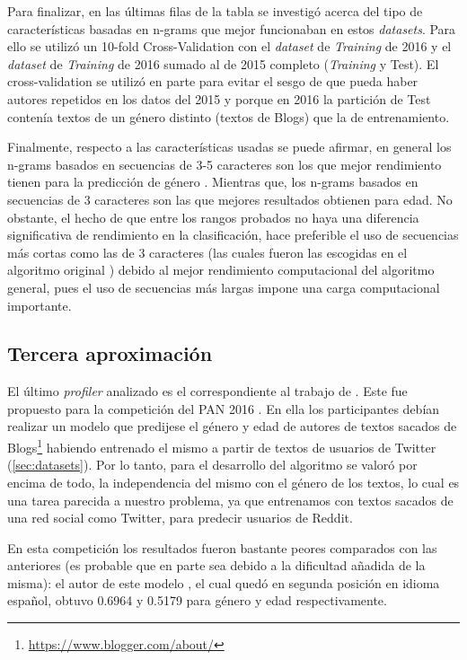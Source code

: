 Para finalizar, en las últimas filas de la tabla se investigó acerca del tipo de características basadas en n-grams que mejor funcionaban en estos \textit{datasets}. Para ello se utilizó un 10-fold Cross-Validation con el \textit{dataset} de \textit{Training} de 2016 y el \textit{dataset} de \textit{Training} de 2016 sumado al de 2015 completo (\textit{Training} y Test). El cross-validation se utilizó en parte para evitar el sesgo de que pueda haber autores repetidos en los datos del 2015 y porque en 2016 la partición de Test contenía textos de un género distinto (textos de Blogs) que la de entrenamiento. 

Finalmente, respecto a las características usadas se puede afirmar, en general los n-grams basados en secuencias de 3-5 caracteres son los que mejor rendimiento tienen para la predicción de género . Mientras que, los n-grams basados en secuencias de 3 caracteres son las que mejores resultados obtienen para edad. No obstante, el hecho de que entre los rangos probados no haya una diferencia significativa de rendimiento en la clasificación, hace preferible el uso de secuencias más cortas como las de 3 caracteres (las cuales fueron las escogidas en el algoritmo original \citep{grivas2015author}) debido al mejor rendimiento computacional del algoritmo general, pues el uso de secuencias más largas impone una carga computacional importante.

\subsection{Tercera aproximación}
\label{subsec:3aprox}

El último \textit{profiler} analizado es el correspondiente al trabajo de \citet{modaresi:2016}. Este fue propuesto para la competición del PAN 2016 \citep{pan:2016}. En ella los participantes debían realizar un modelo que predijese el género y edad de autores de textos sacados de Blogs\footnote{\url{https://www.blogger.com/about/}} habiendo entrenado el mismo a partir de textos de usuarios de Twitter (\ref{sec:datasets}). Por lo tanto, para el desarrollo del algoritmo se valoró por encima de todo, la independencia del mismo con el género de los textos, lo cual es una tarea parecida a nuestro problema, ya que entrenamos con textos sacados de una red social como Twitter, para predecir usuarios de Reddit.

En esta competición los resultados fueron bastante peores comparados con las anteriores (es probable que en parte sea debido a la dificultad añadida de la misma): el autor de este modelo \citep{modaresi:2016}, el cual quedó en segunda posición en idioma español, obtuvo 0.6964 y 0.5179 para género y edad respectivamente.

